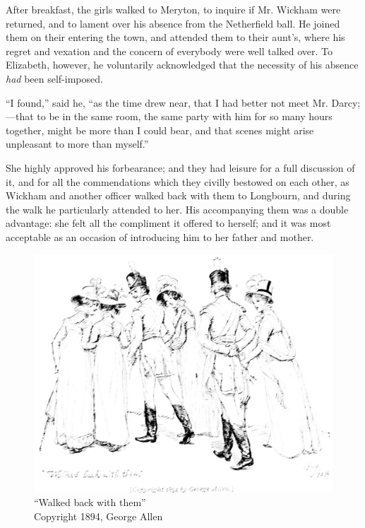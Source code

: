 After breakfast, the girls walked to Meryton, to inquire if Mr. Wickham were returned, and to lament over his absence from the Netherfield ball. He joined them on their entering the town, and attended them to their aunt's, where his regret and vexation and the concern of everybody were well talked over. To Elizabeth, however, he voluntarily acknowledged that the necessity of his absence \textit{had} been self-imposed.

``I found,'' said he, ``as the time drew near, that I had better not meet Mr. Darcy;---that to be in the same room, the same party with him for so many hours together, might be more than I could bear, and that scenes might arise unpleasant to more than myself.''

She highly approved his forbearance; and they had leisure for a full discussion of it, and for all the commendations which they civilly bestowed on each other, as Wickham and another officer walked back with them to Longbourn, and during the walk he particularly attended to her. His accompanying them was a double advantage: she felt all the compliment it offered to herself; and it was most acceptable as an occasion of introducing him to her father and mother.

\begin{figure}[htbp]
    \centering
    \includegraphics[width=\textwidth]{illustrations/i_177.jpg}
    \caption{“Walked back with them”\\ Copyright 1894, George Allen}
    \label{fig:image}
\end{figure}



